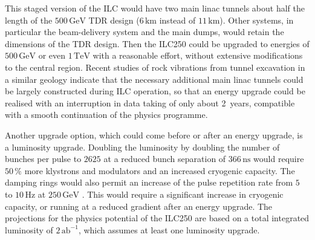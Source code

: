 \documentclass[%
 reprint,
 amsmath,amssymb,
 aps,
]{revtex4-1}
\begin{document}
This staged version of the ILC  
would have two main linac tunnels about half the length of the
$500\,{\mathrm{GeV}}$ TDR design    ($6\,{\mathrm{km}}$  instead of $11\,{\mathrm{km}}$).
Other systems, in particular the beam-delivery system and the 
main dumps, would retain the dimensions of the TDR design.
Then the ILC250 could be upgraded to energies of $500\,{\mathrm{GeV}}$
or even $1\,{\mathrm{TeV}}$ with a reasonable effort, without
extensive
 modifications to the central region. 
Recent studies of rock vibrations from tunnel excavation in a similar
geology indicate that the necessary additional main linac tunnels
could be largely constructed during ILC operation, so that an energy
upgrade could be realised with an interruption in data taking of only
about 2~years, 
compatible with a smooth 
continuation of the physics programme.

Another upgrade option, which could come before or after an energy upgrade, is a luminosity upgrade. 
Doubling the luminosity by doubling the number of bunches per pulse to $2625$ at a reduced bunch separation of $366\,{\mathrm{ns}}$ would require $50\,\%$ more klystrons and modulators and an increased cryogenic capacity. 
The damping rings would also permit an increase of the pulse
 repetition rate from $5$ to $10\,{\mathrm{Hz}}$ at $250\,{\mathrm{GeV}}$ .  
This would require a significant increase in cryogenic capacity, 
or running at a reduced gradient after an energy upgrade.
The projections for the physics potential 
of the ILC250 are based on a total integrated 
luminosity of $2\,{\mathrm{ab}}^{-1}$, which assumes at least one luminosity upgrade.

\end{document}

